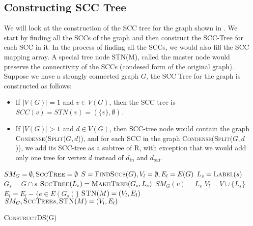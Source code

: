 \subsection{Constructing SCC Tree}

We will look at the construction of the SCC tree for the graph shown in \figureref{\ref{fig:graph1}}.
We start by finding all the SCCs of the graph and then construct the SCC-Tree for each SCC in it.
In the process of finding all the SCCs, we would also fill the SCC mapping array. 
A special tree node \textsc{STN}(M), called the master node would preserve the connectivity of the SCCs (condesed form of the original graph).
Suppose we have a strongly connected graph $G$, the SCC Tree for the graph is constructed as follows:
\begin{itemize}
    \item If $|V(G)| = 1$ and $v \in V(G)$, then the SCC tree is $SCC(v) = STN(v) = (\{v\}, \emptyset)$.
    \item If $|V(G)| > 1$ and $d \in V(G)$, then SCC-tree node would contain the graph \textsc{Condense}(\textsc{Split}($G, d$)), 
    and for each SCC in the graph \textsc{Condense}(\textsc{Split}($G, d$)), we add its SCC-tree as a subtree of R, with 
    exception that we would add only one tree for vertex $d$ instead of $d_{in}$ and $d_{out}$.
\end{itemize}

\begin{algorithm}
    \SetAlgoLined
    $SM_{G} = \emptyset, \textsc{SccTree} = \emptyset$\;
    $S = \textsc{FindSccs}(G), V_l = \emptyset, E_l = E(G)$\;
     {
        $L_s = \textsc{Label}(s)$\;
        $G_s = G \cap s$\;
        $\textsc{SccTree}(L_s) = \textsc{MakeTree}(G_s, L_s)$\;
         {
            $SM_{G}(v) = L_s$\;
        }
        $V_l = V \cup \{L_s\}$\;
        $E_l = E_l - \{e \in E(G_s)\}$\;
    }
    $\textsc{STN}(M) = (V_l, E_l)$\;
    \Return $SM_{G}, \textsc{SccTree}s, \textsc{STN}(M) = (V_l, E_l)$\;

    \caption{\textsc{ConstructDS}(G)}
\end{algorithm}

